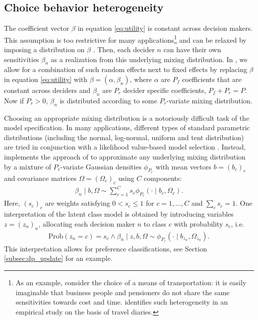 \documentclass[article]{jss}
\begin{document}
\subsection{Choice behavior heterogeneity} \label{subsec:heterogeneity}

The coefficient vector $\beta$ in equation \eqref{eq:utility} is constant across decision makers. This assumption is too restrictive for many applications\footnote{As an example, consider the choice of a means of transportation: it is easily imaginable that business people and pensioners do not share the same sensitivities towards cost and time. \cite{Cirillo:2006} identifies such heterogeneity in an empirical study on the basis of travel diaries.} and can be relaxed by imposing a distribution on $\beta$ \citep[Ch.\ 6]{Train:2009}. Then, each decider $n$ can have their own sensitivities $\beta_n$ as a realization from this underlying mixing distribution. In , we allow for a combination of such random effects next to fixed effects by replacing $\beta$ in equation \eqref{eq:utility} with $\beta = (\alpha, \beta_n)$, where $\alpha$ are $P_f$ coefficients that are constant across deciders and $\beta_n$ are $P_r$ decider specific coefficients, $P_f + P_r = P$. Now if $P_r>0$, $\beta_n$ is distributed according to some $P_r$-variate mixing distribution.

Choosing an appropriate mixing distribution is a notoriously difficult task of the model specification. In many applications, different types of standard parametric distributions (including the normal, log-normal, uniform and tent distribution) are tried in conjunction with a likelihood value-based model selection \citep[pp.\ 136 ff.\ ]{Train:2009}. Instead,  implements the approach of \cite{Oelschlaeger:2020} to approximate any underlying mixing distribution by a mixture of $P_r$-variate Gaussian densities $\phi_{P_r}$ with mean vectors $b=(b_c)_{c}$ and covariance matrices $\Omega=(\Omega_c)_{c}$ using $C$ components:
\begin{align*}
\beta_n\mid b,\Omega \sim \sum_{c=1}^{C} s_c \phi_{P_r} (\cdot \mid b_c,\Omega_c).
\end{align*}
Here, $(s_c)_{c}$ are weights satisfying $0 < s_c\leq 1$ for $c=1,\dots,C$ and $\sum_c s_c=1$. One interpretation of the latent class model is obtained by introducing variables $z=(z_n)_n$, allocating each decision maker $n$ to class $c$ with probability $s_c$, i.e.\
\begin{align*}
\text{Prob}(z_n=c)=s_c \land \beta_n \mid z,b,\Omega \sim \phi_{P_r}(\cdot \mid b_{z_n},\Omega_{z_n}).
\end{align*}
This interpretation allows for preference classifications, see Section \ref{subsec:dp_update} for an example.
\end{document}

